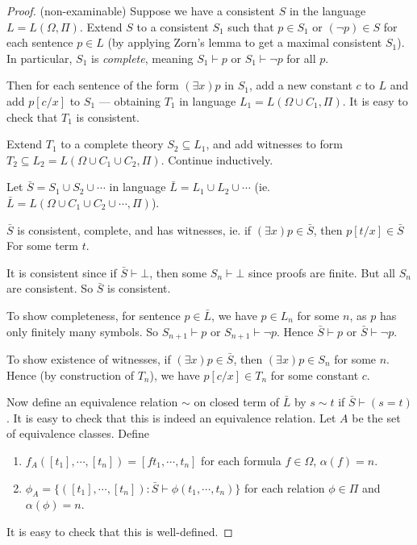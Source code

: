 \documentclass[a4paper]{article}
\begin{document}
\begin{proof}(non-examinable)
  Suppose we have a consistent $S$ in the language $L = L(\Omega, \Pi)$. Extend $S$ to a consistent $S_1$ such that $p\in S_1$ or $(\neg p)\in S$ for each sentence $p\in L$ (by applying Zorn's lemma to get a maximal consistent $S_1$). In particular, $S_1$ is \emph{complete}, meaning $S_1\vdash p$ or $S_1 \vdash \neg p$ for all $p$.

  Then for each sentence of the form $(\exists x)p$ in $S_1$, add a new constant $c$ to $L$ and add $p[c/x]$ to $S_1$ --- obtaining $T_1$ in language $L_1 = L(\Omega \cup C_1, \Pi)$. It is easy to check that $T_1$ is consistent.

  Extend $T_1$ to a complete theory $S_2\subseteq L_1$, and add witnesses to form $T_2 \subseteq L_2 = L(\Omega \cup C_1 \cup C_2, \Pi)$. Continue inductively.

  Let $\bar S = S_1 \cup S_2 \cup \cdots$ in language $\bar L = L_1\cup L_2\cup \cdots$ (ie. $\bar L = L(\Omega\cup C_1\cup C_2\cup\cdots, \Pi)$).

  \begin{claim}
    $\bar S$ is consistent, complete, and has witnesses, ie. if $(\exists x)p \in \bar S$, then $p[t/x]\in \bar S$ For some term $t$.
  \end{claim}

  It is consistent since if $\bar S \vdash \bot$, then some $S_n \vdash \bot$ since proofs are finite. But all $S_n$ are consistent. So $\bar S$ is consistent.

  To show completeness, for sentence $p\in \bar L$, we have $p\in L_n$ for some $n$, as $p$ has only finitely many symbols. So $S_{n + 1} \vdash p$ or $S_{n + 1}\vdash \neg p$. Hence $\bar S \vdash p$ or $\bar S \vdash \neg p$.

  To show existence of witnesses, if $(\exists x)p \in \bar S$, then $(\exists x) p\in S_n$ for some $n$. Hence (by construction of $T_n$), we have $p[c/x] \in T_n$ for some constant $c$.

  Now define an equivalence relation $\sim$ on closed term of $\bar L$ by $s\sim t$ if $\bar S\vdash (s = t)$. It is easy to check that this is indeed an equivalence relation. Let $A$ be the set of equivalence classes. Define
  \begin{enumerate}
    \item $f_A([t_1],\cdots, [t_n]) = [f t_1, \cdots, t_n]$ for each formula $f\in \Omega$, $\alpha(f) = n$.
    \item $\phi_A = \{([t_1], \cdots, [t_n]): \bar S \vdash \phi(t_1, \cdots, t_n)\}$ for each relation $\phi \in \Pi$ and $\alpha (\phi) = n$.
  \end{enumerate}
  It is easy to check that this is well-defined.


\end{proof}
\end{document}
